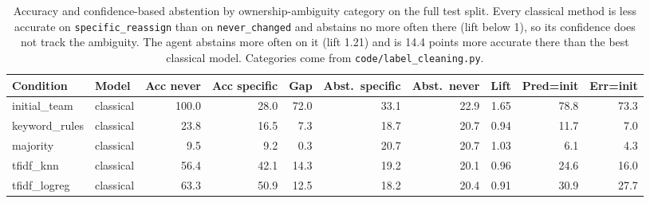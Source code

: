 \begin{table}[t]\centering
\caption{Accuracy and confidence-based abstention by ownership-ambiguity category on the full test split. Every classical method is less accurate on \texttt{specific\_reassign} than on \texttt{never\_changed} and abstains no more often there (lift below 1), so its confidence does not track the ambiguity. The agent abstains more often on it (lift 1.21) and is 14.4 points more accurate there than the best classical model. Categories come from \texttt{code/label\_cleaning.py}.}
\label{tab:ambiguity-test}
\begin{tabular}{llrrrrrrrr}
\toprule
Condition & Model & Acc never & Acc specific & Gap & Abst.\ specific & Abst.\ never & Lift & Pred=init & Err=init \\
\midrule
initial\_team & classical & 100.0 & 28.0 & 72.0 & 33.1 & 22.9 & 1.65 & 78.8 & 73.3 \\
keyword\_rules & classical & 23.8 & 16.5 & 7.3 & 18.7 & 20.7 & 0.94 & 11.7 & 7.0 \\
majority & classical & 9.5 & 9.2 & 0.3 & 20.7 & 20.7 & 1.03 & 6.1 & 4.3 \\
tfidf\_knn & classical & 56.4 & 42.1 & 14.3 & 19.2 & 20.1 & 0.96 & 24.6 & 16.0 \\
tfidf\_logreg & classical & 63.3 & 50.9 & 12.5 & 18.2 & 20.4 & 0.91 & 30.9 & 27.7 \\
\bottomrule
\end{tabular}
\end{table}
